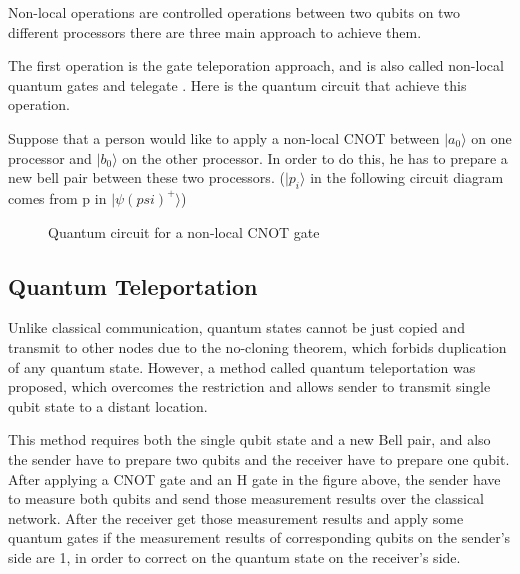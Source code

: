 Non-local operations are controlled operations between two qubits on two different processors there are three main approach to achieve them.

The first operation is the gate teleporation approach, and is also called non-local quantum gates \cite{gateteleportation} and telegate \cite{arithmetic}.  Here is the quantum circuit that achieve this operation.

Suppose that a person would like to apply a non-local CNOT between $|a_0\rangle$ on one processor and $|b_0\rangle$ on the other processor.  In order to do this, he has to prepare a new bell pair between these two processors.  ($|p_i\rangle$ in the following circuit diagram comes from p in $|\psi (psi)^+\rangle$)

 \begin{figure}[ht]
  	\begin{center}
		\caption{Quantum circuit for a non-local CNOT gate}
	\end{center}
\end{figure}

\newpage 

\subsection{Quantum Teleportation}

  Unlike classical communication, quantum states cannot be just copied and transmit to other nodes due to the no-cloning theorem, which forbids duplication of any quantum state.  However, a method called quantum teleportation \cite{teleportation} was proposed, which overcomes the restriction and allows sender to transmit single qubit state to a distant location. 
 		
This method requires both the single qubit state and a new Bell pair, and also the sender have to prepare two qubits and the receiver have to prepare one qubit.  After applying a CNOT gate and an H gate in the figure above, the sender have to measure both qubits and send those measurement results over the classical network.  After the receiver get those measurement results and apply some quantum gates if the measurement results of corresponding qubits on the sender's side are 1, in order to correct on the quantum state on the receiver's side.

